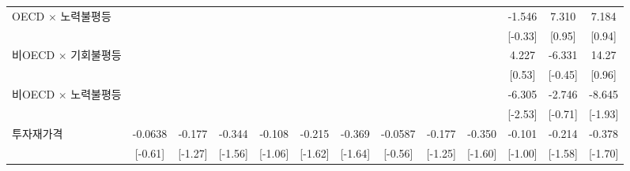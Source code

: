 \begin{tabular}{l*{12}{c}}
\addlinespace
OECD $\times$ 노력불평등&                     &                     &                     &                     &                     &                     &                     &                     &                     &      -1.546         &       7.310         &       7.184         \\
                    &                     &                     &                     &                     &                     &                     &                     &                     &                     &     [-0.33]         &      [0.95]         &      [0.94]         \\
\addlinespace
비OECD $\times$ 기회불평등&                     &                     &                     &                     &                     &                     &                     &                     &                     &       4.227         &      -6.331         &       14.27         \\
                    &                     &                     &                     &                     &                     &                     &                     &                     &                     &      [0.53]         &     [-0.45]         &      [0.96]         \\
\addlinespace
비OECD $\times$ 노력불평등&                     &                     &                     &                     &                     &                     &                     &                     &                     &      -6.305\sym{**} &      -2.746         &      -8.645\sym{*}  \\
                    &                     &                     &                     &                     &                     &                     &                     &                     &                     &     [-2.53]         &     [-0.71]         &     [-1.93]         \\
\addlinespace
투자재가격        &     -0.0638         &      -0.177         &      -0.344         &      -0.108         &      -0.215         &      -0.369         &     -0.0587         &      -0.177         &      -0.350         &      -0.101         &      -0.214         &      -0.378\sym{*}  \\
                    &     [-0.61]         &     [-1.27]         &     [-1.56]         &     [-1.06]         &     [-1.62]         &     [-1.64]         &     [-0.56]         &     [-1.25]         &     [-1.60]         &     [-1.00]         &     [-1.58]         &     [-1.70]         \\

\end{tabular}
